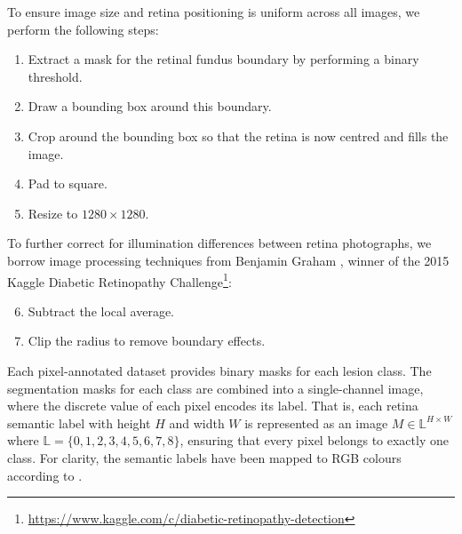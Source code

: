 To ensure image size and retina positioning is uniform across all images, we perform the following steps:
\begin{enumerate}
    \item Extract a mask for the retinal fundus boundary by performing a binary threshold.
    \item Draw a bounding box around this boundary.
    \item Crop around the bounding box so that the retina is now centred and fills the image.
    \item Pad to square.
    \item Resize to $1280 \times 1280$.
\end{enumerate}
To further correct for illumination differences between retina photographs, we borrow image processing techniques from Benjamin Graham \cite{benjamingraham}, winner of the 2015 Kaggle Diabetic Retinopathy Challenge\footnote{\url{ https://www.kaggle.com/c/diabetic-retinopathy-detection}}:
\begin{enumerate}
    \setcounter{enumi}{5}
    \item Subtract the local average.
    \item Clip the radius to remove boundary effects.
\end{enumerate}
Each pixel-annotated dataset provides binary masks for each lesion class.
The segmentation masks for each class are combined into a single-channel image, where the discrete value of each pixel encodes its label.
That is, each retina semantic label with height $H$ and width $W$ is represented as an image $M \in \mathbb{L}^{H\times W}$ where $\mathbb{L} = \{ 0, 1, 2, 3, 4, 5, 6, 7, 8 \}$, ensuring that every pixel belongs to exactly one class.
For clarity, the semantic labels have been mapped to RGB colours according to .

\newcommand{\thiscolor}[1]{\hfill \texttt{\convertcolorspec{named}{#1}{RGB}\RGBcolor (\RGBcolor)} \fcolorbox{black}{#1}{\hspace{2mm}}}


